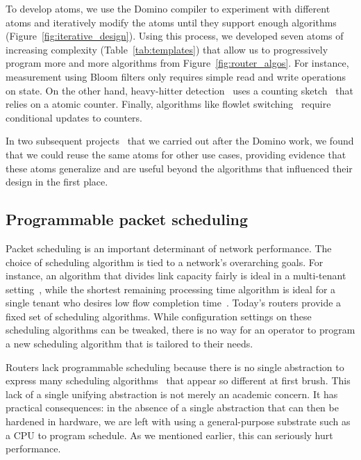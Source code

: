 To develop atoms, we use the Domino compiler to experiment with different atoms
and iteratively modify the atoms until they support enough algorithms
(Figure~\ref{fig:iterative_design}).  Using this process, we developed seven
atoms of increasing complexity (Table~\ref{tab:templates}) that allow us to
progressively program more and more algorithms from
Figure~\ref{fig:router_algos}. For instance, measurement using Bloom filters
only requires simple read and write operations on state. On the other hand,
heavy-hitter detection~\cite{opensketch} uses a counting
sketch~\cite{count_min} that relies on a atomic counter. Finally, algorithms
like flowlet switching~\cite{flare} require conditional updates to counters.

In two subsequent projects~\cite{hula, perf_query} that we carried out after
the Domino work, we found that we could reuse the same atoms for other use
cases, providing evidence that these atoms generalize and are useful beyond the
algorithms that influenced their design in the first place.

\subsection{Programmable packet scheduling}
Packet scheduling is an important determinant of network performance. The
choice of scheduling algorithm is tied to a network's overarching goals. For
instance, an algorithm that divides link capacity fairly is ideal in a
multi-tenant setting~\cite{wfq}, while the shortest remaining processing time
algorithm is ideal for a single tenant who desires low flow completion
time~\cite{pFabric}. Today's routers provide a fixed set of scheduling
algorithms. While configuration settings on these scheduling algorithms can be
tweaked, there is no way for an operator to program a new scheduling algorithm
that is tailored to their needs.

Routers lack programmable scheduling because there is no single abstraction to
express many scheduling algorithms~\cite{wfq, srpt, srr, pFabric, lstf, csz}
that appear so different at first brush. This lack of a single unifying
abstraction is not merely an academic concern. It has practical consequences:
in the absence of a single abstraction that can then be hardened in hardware,
we are left with using a general-purpose substrate such as a CPU to program
schedule. As we mentioned earlier, this can seriously hurt performance.

